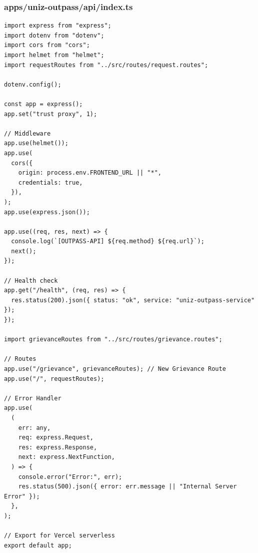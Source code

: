 \documentclass[11pt,a4paper,oneside]{article}
\begin{document}
\subsubsection*{apps/uniz-outpass/api/index.ts}
\begin{lstlisting}
import express from "express";
import dotenv from "dotenv";
import cors from "cors";
import helmet from "helmet";
import requestRoutes from "../src/routes/request.routes";

dotenv.config();

const app = express();
app.set("trust proxy", 1);

// Middleware
app.use(helmet());
app.use(
  cors({
    origin: process.env.FRONTEND_URL || "*",
    credentials: true,
  }),
);
app.use(express.json());

app.use((req, res, next) => {
  console.log(`[OUTPASS-API] ${req.method} ${req.url}`);
  next();
});

// Health check
app.get("/health", (req, res) => {
  res.status(200).json({ status: "ok", service: "uniz-outpass-service" });
});

import grievanceRoutes from "../src/routes/grievance.routes";

// Routes
app.use("/grievance", grievanceRoutes); // New Grievance Route
app.use("/", requestRoutes);

// Error Handler
app.use(
  (
    err: any,
    req: express.Request,
    res: express.Response,
    next: express.NextFunction,
  ) => {
    console.error("Error:", err);
    res.status(500).json({ error: err.message || "Internal Server Error" });
  },
);

// Export for Vercel serverless
export default app;

\end{lstlisting}
\end{document}
